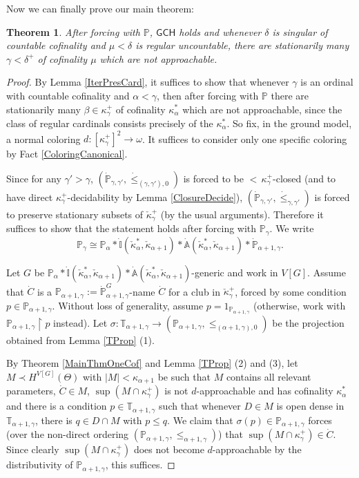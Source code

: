 \documentclass[a4paper]{amsart}
\theoremstyle{definition}
\theoremstyle{remark}
\theoremstyle{plain}
\newtheorem{mysen}[mydef]{Theorem}
\numberwithin{mydef}{section}
\newcommand{\dA}{\mathbb{A}}
\newcommand{\dI}{\mathbb{I}}
\newcommand{\dP}{\mathbb{P}}
\newcommand{\dT}{\mathbb{T}}
\newcommand{\uhr}{\upharpoonright}
\newcommand{\GCH}{\mathsf{GCH}}
\begin{document}
	Now we can finally prove our main theorem:
	
	\begin{mysen}
		After forcing with $\dP$, $\GCH$ holds and whenever $\delta$ is singular of countable cofinality and $\mu<\delta$ is regular uncountable, there are stationarily many $\gamma<\delta^+$ of cofinality $\mu$ which are not approachable.
	\end{mysen}
	
	\begin{proof}
		By Lemma \ref{IterPresCard}, it suffices to show that whenever $\gamma$ is an ordinal with countable cofinality and $\alpha<\gamma$, then after forcing with $\dP$ there are stationarily many $\beta\in\kappa_{\gamma}^+$ of cofinality $\kappa_{\alpha}^*$ which are not approachable, since the class of regular cardinals consists precisely of the $\kappa_{\alpha}^*$. So fix, in the ground model, a normal coloring $d\colon[\kappa_{\gamma}^+]^2\to\omega$. It suffices to consider only one specific coloring by Fact \ref{ColoringCanonical}.
		
		Since for any $\gamma'>\gamma$, $(\dot{\dP}_{\gamma,\gamma'},\dot{\leq}_{(\gamma,\gamma'),0})$ is forced to be ${<}\,\kappa_{\gamma}^+$-closed (and to have direct $\kappa_{\gamma}^+$-decidability by Lemma \ref{ClosureDecide}), $(\dot{\dP}_{\gamma,\gamma'},\dot{\leq}_{\gamma,\gamma'})$ is forced to preserve stationary subsets of $\check{\kappa}_{\gamma}^+$ (by the usual arguments). Therefore it suffices to show that the statement holds after forcing with $\dP_{\gamma}$. We write 
		$$\dP_{\gamma}\cong\dP_{\alpha}*\dot{\dI}(\check{\kappa}_{\alpha}^*,\check{\kappa}_{\alpha+1})*\dot{\dA}(\check{\kappa}_{\alpha}^*,\check{\kappa}_{\alpha+1})*\dot{\dP}_{\alpha+1,\gamma}.$$
		
		Let $G$ be $\dP_{\alpha}*\dot{\dI}(\check{\kappa}_{\alpha}^*,\check{\kappa}_{\alpha+1})*\dot{\dA}(\check{\kappa}_{\alpha}^*,\check{\kappa}_{\alpha+1})$-generic and work in $V[G]$. Assume that $\dot{C}$ is a $\dP_{\alpha+1,\gamma}:=\dot{\dP}_{\alpha+1,\gamma}^G$-name $\dot{C}$ for a club in $\check{\kappa}_{\gamma}^+$, forced by some condition $p\in\dP_{\alpha+1,\gamma}$. Without loss of generality, assume $p=1_{\dP_{\alpha+1,\gamma}}$ (otherwise, work with $\dP_{\alpha+1,\gamma}\uhr p$ instead). Let $\sigma\colon\dT_{\alpha+1,\gamma}\to(\dP_{\alpha+1,\gamma},\leq_{(\alpha+1,\gamma),0})$ be the projection obtained from Lemma \ref{TProp} (1).
		
		By Theorem \ref{MainThmOneCof} and Lemma \ref{TProp} (2) and (3), let $M\prec H^{V[G]}(\Theta)$ with $|M|<\kappa_{\alpha+1}$ be such that $M$ contains all relevant parameters, $\dot{C}\in M$, $\sup(M\cap\kappa_{\gamma}^+)$ is not $d$-approachable and has cofinality $\kappa_{\alpha}^*$ and there is a condition $p\in\dT_{\alpha+1,\gamma}$ such that whenever $D\in M$ is open dense in $\dT_{\alpha+1,\gamma}$, there is $q\in D\cap M$ with $p\leq q$. We claim that $\sigma(p)\in\dP_{\alpha+1,\gamma}$ forces (over the non-direct ordering $(\dP_{\alpha+1,\gamma},\leq_{\alpha+1,\gamma})$) that $\sup(M\cap\kappa_{\gamma}^+)\in\dot{C}$. Since clearly $\sup(M\cap\kappa_{\gamma}^+)$ does not become $d$-approachable by the distributivity of $\dP_{\alpha+1,\gamma}$, this suffices.
		

\end{proof}
\end{document}
